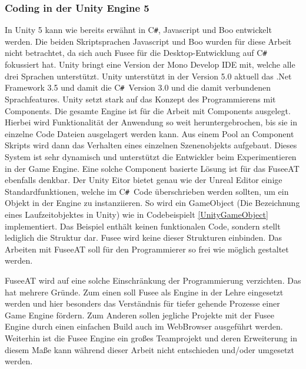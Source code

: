 \documentclass[pagesize, paper=a4, fontsize=12pt, titlepage=true, headings=small, headnosepline, abstractoff, liststotoc, nochapterprefix, plainheadsepline, twoside]{scrreprt}
\newcommand{\CS}{C\texttt{\#}}
\newcommand{\CSS}{C\texttt{\# }}
\begin{document}
\subsubsection{Coding in der Unity Engine 5}
In Unity 5 kann wie bereits erwähnt in \CS, Javascript und Boo entwickelt werden. Die beiden Skriptsprachen Javascript und Boo wurden für diese Arbeit nicht betrachtet, da sich auch Fusee für die Desktop-Entwicklung auf \CSS fokussiert hat. Unity bringt eine Version der Mono Develop IDE mit, welche alle drei Sprachen unterstützt. Unity unterstützt in der Version 5.0 aktuell das .Net Framework 3.5 und damit die \CSS Version 3.0 und die damit verbundenen Sprachfeatures. Unity setzt stark auf das Konzept des Programmierens mit Components. Die gesamte Engine ist für die Arbeit mit Components ausgelegt. Hierbei wird Funktionalität der Anwendung so weit heruntergebrochen, bis sie in einzelne Code Dateien ausgelagert werden kann. Aus einem Pool an Component Skripts wird dann das Verhalten eines einzelnen Szenenobjekts aufgebaut. Dieses System ist sehr dynamisch und unterstützt die Entwickler beim Experimentieren in der Game Engine. Eine solche Component basierte Lösung ist für das FuseeAT ebenfalls denkbar. Der Unity Eitor bietet genau wie der Unreal Editor einige Standardfunktionen, welche im \CSS Code überschrieben werden sollten, um ein Objekt in der Engine zu instanziieren. So wird ein GameObject (Die Bezeichnung eines Laufzeitobjektes in Unity) wie in Codebeispielt \ref{UnityGameObject} implementiert. Das Beispiel enthält keinen funktionalen Code, sondern stellt lediglich die Struktur dar. Fusee wird keine dieser Strukturen einbinden. Das Arbeiten mit FuseeAT soll für den Programmierer so frei wie möglich gestaltet werden.



FuseeAT wird auf eine solche Einschränkung der Programmierung verzichten. Das hat mehrere Gründe. Zum einen soll Fusee als Engine in der Lehre eingesetzt werden und hier besonders das Verständnis für tiefer gehende Prozesse einer Game Engine fördern. Zum Anderen sollen jegliche Projekte mit der Fusee Engine durch einen einfachen Build auch im WebBrowser ausgeführt werden. Weiterhin ist die Fusee Engine ein großes Teamprojekt und deren Erweiterung in diesem Maße kann während dieser Arbeit nicht entschieden und/oder umgesetzt werden.
\end{document}
